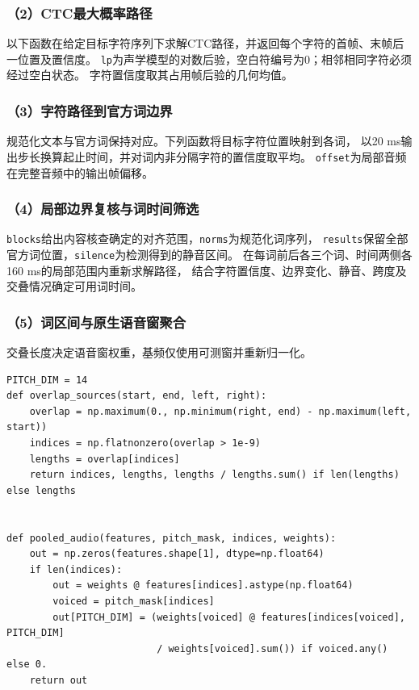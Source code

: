 \subsubsection*{（2）CTC最大概率路径}
以下函数在给定目标字符序列下求解CTC路径，并返回每个字符的首帧、末帧后一位置及置信度。
\texttt{lp}为声学模型的对数后验，空白符编号为0；相邻相同字符必须经过空白状态。
字符置信度取其占用帧后验的几何均值。


\subsubsection*{（3）字符路径到官方词边界}
规范化文本与官方词保持对应。下列函数将目标字符位置映射到各词，
以20 ms输出步长换算起止时间，并对词内非分隔字符的置信度取平均。
\texttt{offset}为局部音频在完整音频中的输出帧偏移。


\subsubsection*{（4）局部边界复核与词时间筛选}
\texttt{blocks}给出内容核查确定的对齐范围，\texttt{norms}为规范化词序列，
\texttt{results}保留全部官方词位置，\texttt{silence}为检测得到的静音区间。
在每词前后各三个词、时间两侧各160 ms的局部范围内重新求解路径，
结合字符置信度、边界变化、静音、跨度及交叠情况确定可用词时间。


\subsubsection*{（5）词区间与原生语音窗聚合}
交叠长度决定语音窗权重，基频仅使用可测窗并重新归一化。
\begin{lstlisting}
PITCH_DIM = 14
def overlap_sources(start, end, left, right):
    overlap = np.maximum(0., np.minimum(right, end) - np.maximum(left, start))
    indices = np.flatnonzero(overlap > 1e-9)
    lengths = overlap[indices]
    return indices, lengths, lengths / lengths.sum() if len(lengths) else lengths


def pooled_audio(features, pitch_mask, indices, weights):
    out = np.zeros(features.shape[1], dtype=np.float64)
    if len(indices):
        out = weights @ features[indices].astype(np.float64)
        voiced = pitch_mask[indices]
        out[PITCH_DIM] = (weights[voiced] @ features[indices[voiced], PITCH_DIM]
                          / weights[voiced].sum()) if voiced.any() else 0.
    return out


\end{lstlisting}

